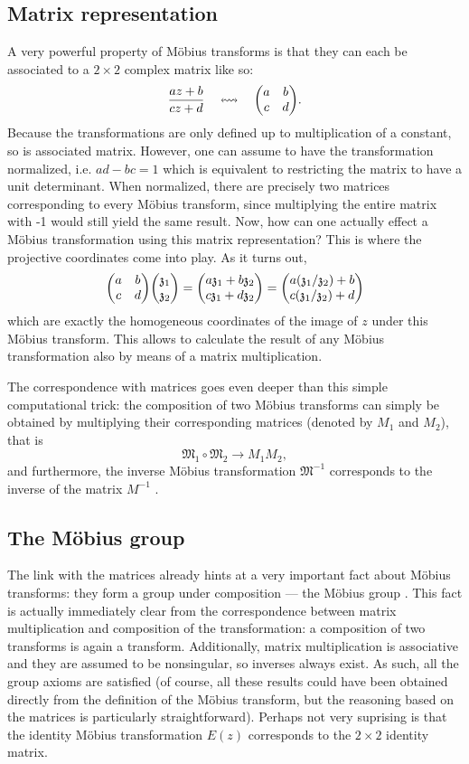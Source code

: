 \subsection{Matrix representation}
A very powerful property of Möbius transforms is that they can each be associated to a \(2\times 2\) complex matrix like so:
\[ \frac{az + b}{cz + d} \corresponds \mqty(a & b \\ c & d).\] 
Because the transformations are only defined up to multiplication of a constant, so is associated matrix. However, one can assume to have the transformation normalized, i.e. \(ad - bc = 1\) which is equivalent to restricting the matrix to have a unit determinant.  When normalized, there are precisely two matrices corresponding to every Möbius transform, since multiplying the entire matrix with -1 would still yield the same result. Now, how can one actually effect a Möbius transformation using this matrix representation? This is where the projective coordinates come into play. As it turns out, 
\[ 
    \mqty(a & b\\ c & d)\mqty(\mathfrak{z}_1\\\mathfrak{z}_2)
    = \mqty(a\mathfrak{z}_1 + b\mathfrak{z}_2\\c\mathfrak{z}_1 + d\mathfrak{z}_2)
    =\mqty(a(\mathfrak{z}_1/\mathfrak{z}_2) + b\\c(\mathfrak{z}_1/\mathfrak{z}_2) + d)
\]
which are exactly the homogeneous coordinates of the image of \(z\) under this Möbius transform. This allows to calculate the result of any Möbius transformation also by means of a matrix multiplication.

The correspondence with matrices goes even deeper than this simple computational trick: the composition of two Möbius transforms  can simply be obtained by multiplying their corresponding matrices (denoted by \(M_1\) and \(M_2\)), that is
\[\mathfrak{M}_1 \circ \mathfrak{M}_2 \to M_1 M_2,\]
and furthermore, the inverse Möbius transformation \(\mathfrak{M}^{-1}\) corresponds to the inverse of the matrix \(M^{-1}\) \cite{Needham2021}.


\subsection{The Möbius group} 
The link with the matrices already hints at a very important fact about Möbius transforms: they form a group under composition --- the Möbius group \moebiusgroup. This fact is actually immediately clear from the correspondence between matrix multiplication and composition of the transformation: a composition of two transforms is again a transform. Additionally, matrix multiplication is associative and they are assumed to be nonsingular, so inverses always exist. As such, all the group axioms are satisfied (of course, all these results could have been obtained directly from the definition of the Möbius transform, but the reasoning based on the matrices is particularly straightforward). Perhaps not very suprising is that the identity Möbius transformation \(E(z)\) corresponds to the \(2\times 2\) identity matrix.

